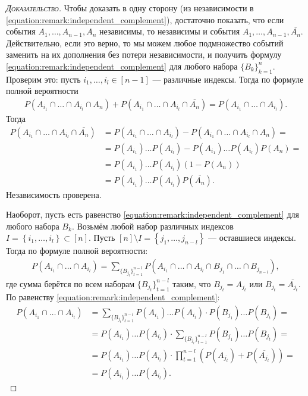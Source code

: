 \documentclass[../main.tex]{subfiles}
\begin{document}
\begin{proof}[\normalfont\textsc{Доказательство}]
 Чтобы доказать в одну сторону (из независимости в \eqref{equation:remark:independent_complement}), достаточно показать, что если события $A_1, \ldots, A_{n-1}, A_n$ независимы, то независимы и события $A_1, \ldots, A_{n-1}, \overline{A_n}$. Действительно, если это верно, то мы можем любое подмножество событий заменить на их дополнения без потери независимости, и получить формулу \eqref{equation:remark:independent_complement} для любого набора $\{B_{k}\}_{k=1}^{n} $. Проверим это: пусть $i_1, \ldots, i_{l} \in [n-1]$ --- различные индексы. Тогда по формуле полной вероятности
 \begin{align*}
  P(A_{i_1} \cap \ldots \cap A_{i_l} \cap A_n) + P(A_{i_1} \cap \ldots \cap A_{i_l} \cap \overline{A_n}) = P(A_{i_1} \cap \ldots \cap A_{i_l}).
 \end{align*} Тогда
 \begin{align*}
  P(A_{i_1} \cap \ldots \cap A_{i_l}\cap \overline{A_n}) &= P(A_{i_1} \cap \ldots \cap A_{i_l}) - P(A_{i_1} \cap \ldots \cap A_{i_l} \cap A_n) = \\
  &= P(A_{i_1})  \ldots  P(A_{i_l}) - P(A_{i_1})  \ldots  P(A_{i_l})  P(A_n) = \\
  &= P(A_{i_1})  \ldots  P(A_{i_l})  (1 - P(A_n)) \\
  &= P(A_{i_1})  \ldots  P(A_{i_l})  P(\overline{A_n}).
 \end{align*} Независимость проверена.

 Наоборот, пусть есть равенство \eqref{equation:remark:independent_complement} для любого набора $B_k$. Возьмём любой набор различных индексов $I = \left\{i_1, \ldots, i_l \right\} \subset [n]$. Пусть $[n] \setminus I = \left\{ j_1, \ldots, j_{n-l} \right\}$ --- оставшиеся индексы. Тогда по формуле полной вероятности:
 \begin{align*}
  P(A_{i_1} \cap \ldots \cap A_{i_l}) = \sum_{\{B_{j_t}\}_{t=1}^{n-l} } P(A_{i_1} \cap \ldots \cap A_{i_l} \cap B_{j_1} \cap \ldots \cap B_{j_{n-l}}),
 \end{align*} где сумма берётся по всем наборам $ \{B_{j_t}\}_{t=1}^{n-l} $ таким, что $B_{j_t} = A_{j_t}$ или $B_{j_t} = \overline{A_{j_t}}$. По равенству \eqref{equation:remark:independent_complement}:
 \begin{align*}
  P(A_{i_1} \cap \ldots \cap A_{i_l}) &= \sum_{\{B_{j_t}\}_{t=1}^{n-l} } P(A_{i_1}) \ldots P(A_{i_l}) \cdot P(B_{j_1}) \ldots P(B_{j_t}) = \\
  &= P(A_{i_1}) \ldots P(A_{i_l}) \cdot \sum_{\{B_{j_t}\}_{t=1}^{n-l} } P(B_{j_1}) \ldots P(B_{j_t}) = \\
  &= P(A_{i_1}) \ldots P(A_{i_l}) \cdot \prod_{t=1}^{n-l} (P(A_{j_t}) + P(\overline{A_{j_t}})) = \\
  &= P(A_{i_1}) \ldots P(A_{i_l}).
 \end{align*} 
\end{proof}
\end{document}

